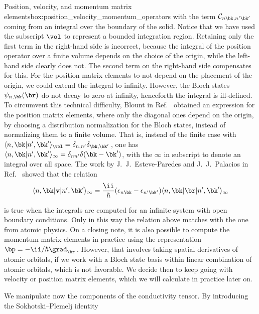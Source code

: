 \begin{mybox}{Position, velocity, and momentum matrix elements}{box:position_velocity_momentum_operators}
\noindent with the term $\mathcal{C}_{n \bk, n' \bk'}$ coming from an integral over the boundary of the solid.
Notice that we have used the subscript $\vol$ to represent a bounded integration region.
Retaining only the first term in the right-hand side is incorrect, because the integral of the position operator over a finite volume depends on the choice of the origin, while the left-hand side clearly does not.
The second term on the right-hand side compensates for this.
For the position matrix elements to not depend on the placement of the origin, we could extend the integral to infinity.
However, the Bloch states $\psi_{n, \bk}(\br)$ do not decay to zero at infinity, henceforth the integral is ill-defined.
To circumvent this technical difficulty, Blount in Ref.~\cite{Blount_1962} obtained an expression for the position matrix elements, where only the diagonal ones depend on the origin, by choosing a distribution normalization for the Bloch states, instead of normalizing them to a finite volume.
That is, instead of the finite case with $\langle n,\bk | n',\bk'\rangle_{\vol} = \delta_{n,n'} \delta_{\bk,\bk'}$\,, one has $\langle n,\bk | n',\bk'\rangle_{\infty} = \delta_{n n'} \delta(\bk-\bk')$, with the $\infty$ in subscript to denote an integral over all space.
The work by J.~J.~Esteve-Paredes and J.~J.~Palacios in Ref.~\cite{Esteve_2023} showed that the relation
\vspace{-0.3cm}
\begin{equation}
    \langle n,\bk|\mathbf{v}|n',\bk'\rangle_{\infty} = \frac{\ii}{\hbar} (\epsilon_{n \bk} - \epsilon_{n' \bk'}) \langle n,\bk|\br|n',\bk'\rangle_{\infty}
\end{equation}

\noindent is true when the integrals are computed for an infinite system with open boundary conditions.
Only in this way the relation above matches with the one from atomic physics.
On a closing note, it is also possible to compute the momentum matrix elements in practice using the representation $\bp = -\ii/\hbar \grad_{\br}$\,.
However, that involves taking spatial derivatives of atomic orbitals, if we work with a Bloch state basis within linear combination of atomic orbitals, which is not favorable.
We decide then to keep going with velocity or position matrix elements, which we will calculate in practice later on.
\end{mybox}

We manipulate now the components of the conductivity tensor.
By introducing the Sokhotski--Plemelj identity~\cite{Muskhelishvili_1977}

